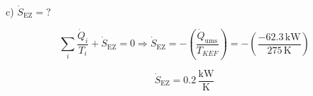 c) $\dot{S}_{\text{EZ}} = ?$

\[
\sum_i \frac{\dot{Q}_i}{T_i} + \dot{S}_{\text{EZ}} = 0 \Rightarrow \dot{S}_{\text{EZ}} = - \left( \frac{\dot{Q}_{\text{ums}}}{T_{KEF}} \right) = - \left( \frac{-62.3 \, \text{kW}}{275 \, \text{K}} \right)
\]

\[
\dot{S}_{\text{EZ}} = 0.2 \, \frac{\text{kW}}{\text{K}}
\]